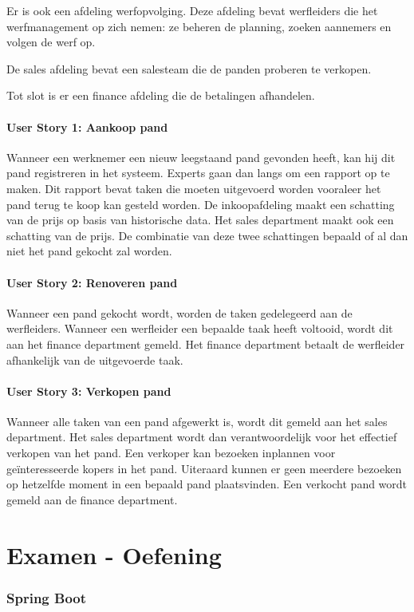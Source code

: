 \documentclass{article}
\begin{document}
Er is ook een afdeling werfopvolging. Deze afdeling bevat werfleiders die het werfmanagement op zich nemen: ze beheren de planning, zoeken aannemers en volgen de werf op.

De sales afdeling bevat een salesteam die de panden proberen te verkopen.

Tot slot is er een finance afdeling die de betalingen afhandelen.

\subsection*{User Story 1: Aankoop pand}
Wanneer een werknemer een nieuw leegstaand pand gevonden heeft, kan hij dit pand registreren in het systeem. Experts gaan dan langs om een rapport op te maken. Dit rapport bevat taken die moeten uitgevoerd worden vooraleer het pand terug te koop kan gesteld worden. De inkoopafdeling maakt een schatting van de prijs op basis van historische data. Het sales department maakt ook een schatting van de prijs. De combinatie van deze twee schattingen bepaald of al dan niet het pand gekocht zal worden.
\subsection*{User Story 2: Renoveren pand}
Wanneer een pand gekocht wordt, worden de taken gedelegeerd aan de werfleiders. Wanneer een werfleider een bepaalde taak heeft voltooid, wordt dit aan het finance department gemeld. Het finance department betaalt de werfleider afhankelijk van de uitgevoerde taak. 

\subsection*{User Story 3: Verkopen pand}
Wanneer alle taken van een pand afgewerkt is, wordt dit gemeld aan het sales department. Het sales department wordt dan verantwoordelijk voor het effectief verkopen van het pand. Een verkoper kan bezoeken inplannen voor geïnteresseerde kopers in het pand. Uiteraard kunnen er geen meerdere bezoeken op hetzelfde moment in een bepaald pand plaatsvinden. Een verkocht pand wordt gemeld aan de finance department.


\part*{Examen - Oefening}
\section*{Spring Boot}
\end{document}
